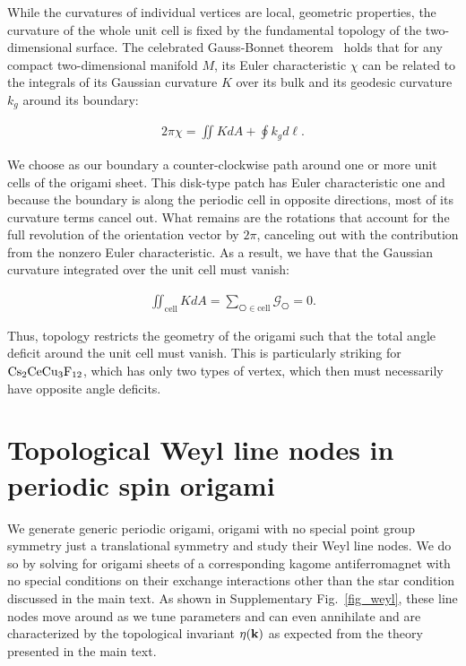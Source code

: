\documentclass[a4paper,aps,prl,floatfix,showpacs,superscriptaddress,notitlepage]{revtex4-1}
\begin{document}
While the curvatures of individual vertices are local, geometric properties, the curvature of the whole unit cell is fixed by the fundamental topology of the two-dimensional surface. The celebrated Gauss-Bonnet theorem~\cite{kamien2002geometry} holds that for any compact two-dimensional manifold $M$, its Euler characteristic $\chi$ can be related to the integrals of its Gaussian curvature $K$ over its bulk and its geodesic curvature $k_g$ around its boundary:

\begin{align}
2\pi \chi = \iint K d A + \oint k_g d \ell.
\end{align}

\noindent We choose as our boundary a counter-clockwise path around one or more unit cells of the origami sheet. This disk-type patch has Euler characteristic one and because the boundary is along the periodic cell in opposite directions, most of its curvature terms cancel out. What remains are the rotations that account for the full revolution of the orientation vector by $2\pi$, canceling out with the contribution from the nonzero Euler characteristic. As a result, we have that the Gaussian curvature integrated over the unit cell must vanish:

\begin{align}
\iint_\textrm{cell} K d A = \sum_{\hexagon\in\textrm{cell}} \mathcal{G}_{\hexagon} = 0.
\end{align}

\noindent Thus, topology restricts the geometry of the origami such that the total angle deficit around the unit cell must vanish. This is particularly striking for ${\rm Cs}_2{\rm CeCu}_3{\rm F}_{12}$, which has only two types of vertex, which then must necessarily have opposite angle deficits.

\section{Topological Weyl line nodes in periodic spin origami}\label{secfour}
We generate generic periodic origami, origami with no special point group symmetry just a translational symmetry and study their Weyl line nodes. We do so by solving for origami sheets of a corresponding kagome antiferromagnet with no special conditions on their exchange interactions other than the star condition discussed in the main text. As shown in Supplementary Fig.~\ref{fig_weyl}, these line nodes move around as we tune parameters and can even annihilate and are characterized by the topological invariant $\eta({\bf k})$ as expected from the theory presented in the main text. 
\end{document}
